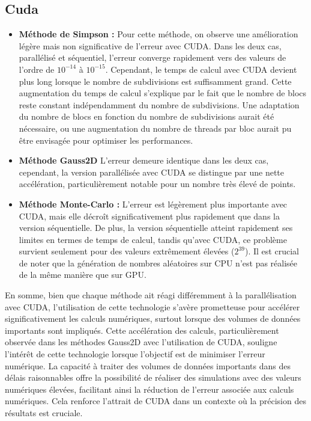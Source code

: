 \documentclass[10pt,a4paper]{article}
\begin{document}
\subsection*{Cuda}
\begin{itemize}
    \item \textbf{Méthode de Simpson :} Pour cette méthode, on observe une amélioration légère mais non significative de l'erreur avec CUDA. Dans les deux cas, parallélisé et séquentiel, l'erreur converge rapidement vers des valeurs de l'ordre de $10^{-14}$ à $10^{-15}$. Cependant, le temps de calcul avec CUDA devient plus long lorsque le nombre de subdivisions est suffisamment grand. Cette augmentation du temps de calcul s'explique par le fait que le nombre de blocs reste constant indépendamment du nombre de subdivisions. Une adaptation du nombre de blocs en fonction du nombre de subdivisions aurait été nécessaire, ou une augmentation du nombre de threads par bloc aurait pu être envisagée pour optimiser les performances.
    \item \textbf{Méthode Gauss2D} L'erreur demeure identique dans les deux cas, cependant, la version parallélisée avec CUDA se distingue par une nette accélération, particulièrement notable pour un nombre très élevé de points.
    \item \textbf{Méthode Monte-Carlo :} L'erreur est légèrement plus importante avec CUDA, mais elle décroît significativement plus rapidement que dans la version séquentielle. De plus, la version séquentielle atteint rapidement ses limites en termes de temps de calcul, tandis qu'avec CUDA, ce problème survient seulement pour des valeurs extrêmement élevées ($2^{39}$). Il est crucial de noter que la génération de nombres aléatoires sur CPU n'est pas réalisée de la même manière que sur GPU.
\end{itemize}
En somme, bien que chaque méthode ait réagi différemment à la parallélisation avec CUDA, l'utilisation de cette technologie s'avère prometteuse pour accélérer significativement les calculs numériques, surtout lorsque des volumes de données importants sont impliqués. Cette accélération des calculs, particulièrement observée dans les méthodes Gauss2D avec l'utilisation de CUDA, souligne l'intérêt de cette technologie lorsque l'objectif est de minimiser l'erreur numérique. La capacité à traiter des volumes de données importants dans des délais raisonnables offre la possibilité de réaliser des simulations avec des valeurs numériques élevées, facilitant ainsi la réduction de l'erreur associée aux calculs numériques. Cela renforce l'attrait de CUDA dans un contexte où la précision des résultats est cruciale.
\end{document}
